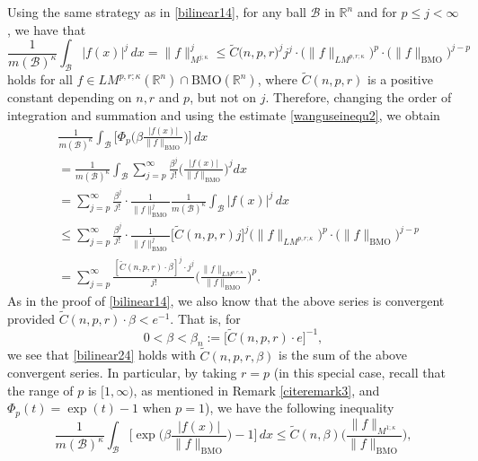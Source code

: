 \documentclass{birkjour}
\theoremstyle{definition}
\theoremstyle{remark}
\numberwithin{equation}{section}
\begin{document}
Using the same strategy as in \eqref{bilinear14}, for any ball $\mathcal{B}$ in $\mathbb R^n$ and for $p\leq j<\infty$, we have that
\begin{equation}\label{wanguseinequ2}
\frac{1}{m(\mathcal{B})^{\kappa}}\int_{\mathcal{B}}|f(x)|^j\,dx
=\big\|f\big\|^j_{M^{j;\kappa}}\leq \widetilde{C}\big(n,p,r\big)^j
j^j\cdot\big(\|f\|_{LM^{p,r;\kappa}}\big)^p\cdot\big(\|f\|_{\mathrm{BMO}}\big)^{j-p}
\end{equation}
holds for all $f\in LM^{p,r;\kappa}(\mathbb R^n)\cap\mathrm{BMO}(\mathbb R^n)$, where $\widetilde{C}(n,p,r)$ is a positive constant depending on $n,r$ and $p$, but not on $j$. Therefore, changing the order of integration and summation and using the estimate \eqref{wanguseinequ2}, we obtain
\begin{equation*}
\begin{split}
&\frac{1}{m(\mathcal{B})^{\kappa}}\int_{\mathcal{B}}\bigg[\Phi_p\Big(\beta\frac{|f(x)|}{\|f\|_{\mathrm{BMO}}}\Big)\bigg]\,dx\\
&=\frac{1}{m(\mathcal{B})^{\kappa}}\int_{\mathcal{B}}
\sum_{j=p}^{\infty}\frac{\beta^j}{j!}\bigg(\frac{|f(x)|}{\|f\|_{\mathrm{BMO}}}\bigg)^jdx\\
&=\sum_{j=p}^{\infty}\frac{\beta^j}{j!}\cdot\frac{1}{\|f\|^j_{\mathrm{BMO}}}
\frac{1}{m(\mathcal{B})^{\kappa}}\int_{\mathcal{B}}|f(x)|^j\,dx\\
&\leq \sum_{j=p}^{\infty}\frac{\beta^j}{j!}\cdot\frac{1}{\|f\|^j_{\mathrm{BMO}}}\big[\widetilde{C}(n,p,r)j\big]^{j}
\big(\|f\|_{LM^{p,r;\kappa}}\big)^p\cdot\big(\|f\|_{\mathrm{BMO}}\big)^{j-p}\\
&=\sum_{j=p}^{\infty}\frac{[\widetilde{C}(n,p,r)\cdot\beta]^j\cdot j^{j}}{j!}
\bigg(\frac{\|f\|_{LM^{p,r;\kappa}}}{\|f\|_{\mathrm{BMO}}}\bigg)^p.
\end{split}
\end{equation*}
As in the proof of \eqref{bilinear14}, we also know that the above series is convergent provided $\widetilde{C}(n,p,r)\cdot\beta<e^{-1}$. That is, for
\begin{equation*}
0<\beta<\beta_n:=\big[\widetilde{C}(n,p,r)\cdot e\big]^{-1},
\end{equation*}
we see that \eqref{bilinear24} holds with $\widetilde{C}({n,p,r,\beta})$ is the sum of the above convergent series. In particular, by taking $r=p$ (in this special case, recall that the range of $p$ is $[1,\infty)$, as mentioned in Remark \ref{citeremark3}, and $\Phi_p(t)=\exp(t)-1$ when $p=1$), we have the following inequality
\begin{equation}\label{jninequality2}
\frac{1}{m(\mathcal{B})^{\kappa}}\int_{\mathcal{B}}
\bigg[\exp\Big(\beta\frac{|f(x)|}{\|f\|_{\mathrm{BMO}}}\Big)-1\bigg]\,dx
\leq \widetilde{C}({n,\beta})\bigg(\frac{\|f\|_{M^{1;\kappa}}}{\|f\|_{\mathrm{BMO}}}\bigg),
\end{equation}
\end{document}
